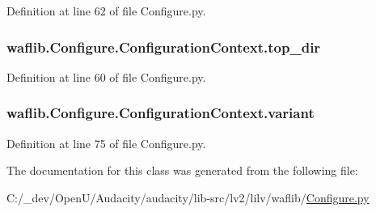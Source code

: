 Definition at line 62 of file Configure.\+py.

\subsubsection[{\texorpdfstring{top\+\_\+dir}{top_dir}}]{\setlength{\rightskip}{0pt plus 5cm}waflib.\+Configure.\+Configuration\+Context.\+top\+\_\+dir}\hypertarget{classwaflib_1_1_configure_1_1_configuration_context_af5c1b0904233001f71a0016c1c15077a}{}\label{classwaflib_1_1_configure_1_1_configuration_context_af5c1b0904233001f71a0016c1c15077a}


Definition at line 60 of file Configure.\+py.

\subsubsection[{\texorpdfstring{variant}{variant}}]{\setlength{\rightskip}{0pt plus 5cm}waflib.\+Configure.\+Configuration\+Context.\+variant}\hypertarget{classwaflib_1_1_configure_1_1_configuration_context_a8a4f042ddd96013a3179867ce0d61a04}{}\label{classwaflib_1_1_configure_1_1_configuration_context_a8a4f042ddd96013a3179867ce0d61a04}


Definition at line 75 of file Configure.\+py.



The documentation for this class was generated from the following file\+:\begin{DoxyCompactItemize}
\item 
C\+:/\+\_\+dev/\+Open\+U/\+Audacity/audacity/lib-\/src/lv2/lilv/waflib/\hyperlink{lilv_2waflib_2_configure_8py}{Configure.\+py}\end{DoxyCompactItemize}
